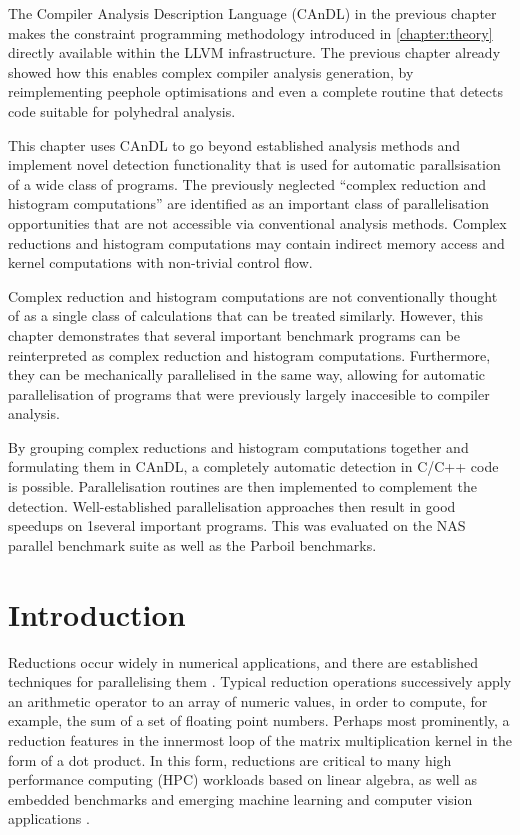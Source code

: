 
    The Compiler Analysis Description Language (CAnDL) in the previous chapter
    makes the constraint programming methodology introduced in
    \autoref{chapter:theory}
    directly available within the LLVM infrastructure.
    The previous chapter already showed how this enables complex compiler
    analysis generation, by reimplementing peephole optimisations and even a
    complete routine that detects code suitable for polyhedral analysis.

    This chapter uses CAnDL to go beyond established analysis methods and
    implement novel detection functionality that is used for automatic
    parallsisation of a wide class of programs.
    The previously neglected ``complex reduction and histogram computations''
    are identified as an important class of parallelisation opportunities that
    are not accessible via conventional analysis methods.
    Complex reductions and histogram computations may contain indirect memory
    access and kernel computations with non-trivial control flow.

    Complex reduction and histogram computations are not conventionally thought
    of as a single class of calculations that can be treated similarly.
    However, this chapter demonstrates that several important benchmark programs
    can be reinterpreted as complex reduction and histogram computations.
    Furthermore, they can be mechanically parallelised in the same way, allowing
    for automatic parallelisation of programs that were previously largely
    inaccesible to compiler analysis.

    By grouping complex reductions and histogram computations together and
    formulating them in CAnDL, a completely automatic detection in C/C++ code is
    possible.
    Parallelisation routines are then implemented to complement the detection.
    Well-established parallelisation approaches then result in good speedups on
    1several important programs.
    This was evaluated on the NAS parallel benchmark suite as well as the
    Parboil benchmarks.

\section{Introduction}

    Reductions occur widely in numerical applications, and there are established
    techniques for parallelising them \citep{Jradi2017fast}.
    Typical reduction operations successively apply an arithmetic operator to an
    array of numeric values, in order to compute, for example, the sum of a set
    of floating point numbers.
    Perhaps most prominently, a reduction features in the innermost loop of the
    matrix multiplication kernel in the form of a dot product.
    In this form, reductions are critical to many high performance computing
    (HPC) workloads based on linear algebra, as well as embedded benchmarks and
    emerging machine learning and computer vision applications
    \citep{Reddy2016Reduction}.

